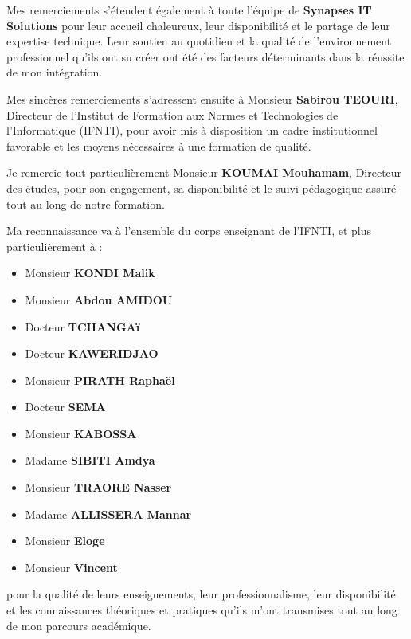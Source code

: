 \documentclass[12pt,a4paper]{report}
\newcommand{\motcle}[1]{\textcolor{marine}{\textbf{#1}}}
\begin{document}
Mes remerciements s'étendent également à toute l'équipe de \motcle{Synapses IT Solutions} pour leur accueil chaleureux, leur disponibilité et le partage de leur expertise technique. Leur soutien au quotidien et la qualité de l'environnement professionnel qu'ils ont su créer ont été des facteurs déterminants dans la réussite de mon intégration.
\vspace{0.3cm}

Mes sincères remerciements s'adressent ensuite à Monsieur \motcle{Sabirou TEOURI}, Directeur de l'Institut de Formation aux Normes et Technologies de l'Informatique (IFNTI), pour avoir mis à disposition un cadre institutionnel favorable et les moyens nécessaires à une formation de qualité.

\vspace{0.3cm}

Je remercie tout particulièrement Monsieur \motcle{KOUMAI Mouhamam}, Directeur des études, pour son engagement, sa disponibilité et le suivi pédagogique assuré tout au long de notre formation.

\vspace{0.3cm}

\begin{accentbox}
Ma reconnaissance va à l'ensemble du corps enseignant de l'IFNTI, et plus particulièrement à :
\begin{itemize}[itemsep=2pt]
    \item Monsieur \motcle{KONDI Malik }
    \item Monsieur \motcle{Abdou AMIDOU}
    \item Docteur \motcle{TCHANGAï}
    \item Docteur \motcle{KAWERIDJAO}
    \item Monsieur \motcle{ PIRATH Raphaël }
    \item Docteur \motcle{SEMA}
    \item Monsieur \motcle{KABOSSA}
    \item Madame \motcle{SIBITI Amdya}
    \item Monsieur \motcle{TRAORE Nasser}
    \item Madame \motcle{ALLISSERA Mannar}
    \item Monsieur \motcle{Eloge}
    \item Monsieur \motcle{Vincent}
    
\end{itemize}
\vspace{0.2cm}
pour la qualité de leurs enseignements, leur professionnalisme, leur disponibilité et les connaissances théoriques et pratiques qu'ils m'ont transmises tout au long de mon parcours académique.
\end{accentbox}
\end{document}
